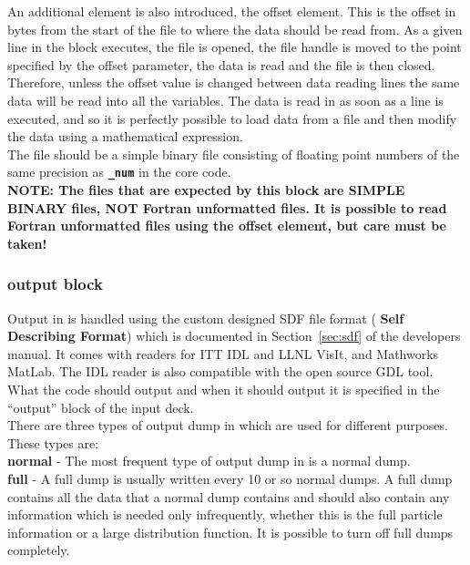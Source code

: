 \documentclass[12pt,a4paper]{article}
\newcommand{\emphtext}{\color{warwickdark} \fontfamily{phv}\selectfont\large\bf}
\newcommand{\inlinecode}[1]{{\color{warwickred} \bf\texttt{#1}}}
\newcommand{\sect}[1]{Section~\ref{sec:#1}}
\newcommand{\inlineemph}[1]{{\color{warwicklight} \bf{#1}}}
\newcommand{\EPOCH}{{\color{warwickdark}\fontfamily{phv}\selectfont{EPOCH}}}
\begin{document}
An additional element is also introduced, the offset element. This
is the offset in bytes from the start of the file to where the data should
be read from. As a given line in the block executes, the file is opened, the
file handle is moved to the point specified by the offset parameter, the data
is read and the file is then closed. Therefore, unless the offset value is
changed between data reading lines the same data will be read into all the
variables. The data is read in as soon as a line is executed, and so it is
perfectly possible to load data from a file and then modify the data using
a mathematical expression.\\

The file should be a simple binary file consisting of floating point numbers of
the same precision as \inlinecode{\_num} in the core {\EPOCH} code.\\

{\emphtext NOTE: The files that are expected by this block are SIMPLE BINARY
files, NOT Fortran unformatted files. It is possible to read Fortran
unformatted files using the offset element, but care must be taken!}\\


\subsubsection{\inlineemph{output} block}
\label{sec:output block}
Output in {\EPOCH} is handled using the custom designed SDF file format
(\inlineemph{Self Describing Format}) which is documented in \sect{sdf}
of the developers manual.
It comes with readers for ITT IDL and LLNL VisIt, and Mathworks MatLab.
The IDL reader is also compatible with the open source GDL tool.
What the code should output and when it should output it is
specified in the ``output'' block of the input deck. \\

There are three types of output dump in {\EPOCH} which are used for different
purposes. These types are:\\

{\emphtext normal} - The most frequent type of output dump in {\EPOCH} is a
normal dump.\\

{\emphtext full} - A full dump is usually written every 10 or so normal
dumps. A full dump contains all the data that a normal dump contains and should
also contain any information which is needed only infrequently, whether this is
the full particle information or a large distribution function. It is possible
to turn off full dumps completely.\\
\end{document}
